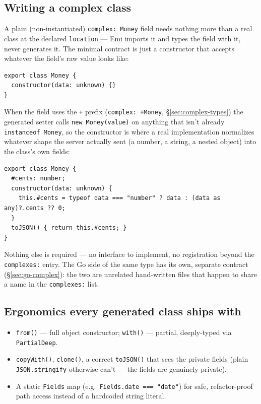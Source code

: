 \subsection{Writing a complex class}
\label{sec:js-complex}
A plain (non-instantiated) \texttt{complex: Money} field needs nothing
more than a real class at the declared \texttt{location} --- Emi imports
it and types the field with it, never generates it. The minimal contract
is just a constructor that accepts whatever the field's raw value looks
like:
\begin{lstlisting}
export class Money {
  constructor(data: unknown) {}
}
\end{lstlisting}
When the field uses the \texttt{+} prefix (\texttt{complex: +Money},
\S\ref{sec:complex-types}) the generated setter calls \texttt{new
Money(value)} on anything that isn't already \texttt{instanceof Money},
so the constructor is where a real implementation normalizes whatever
shape the server actually sent (a number, a string, a nested object)
into the class's own fields:
\begin{lstlisting}
export class Money {
  #cents: number;
  constructor(data: unknown) {
    this.#cents = typeof data === "number" ? data : (data as any)?.cents ?? 0;
  }
  toJSON() { return this.#cents; }
}
\end{lstlisting}
Nothing else is required --- no interface to implement, no registration
beyond the \texttt{complexes:} entry. The Go side of the same type has
its own, separate contract (\S\ref{sec:go-complex}): the two are
unrelated hand-written files that happen to share a name in the
\texttt{complexes:} list.

\subsection{Ergonomics every generated class ships with}
\begin{itemize}[leftmargin=1.1em,itemsep=2pt,topsep=2pt]
  \item \texttt{from()} --- full object constructor; \texttt{with()} ---
        partial, deeply-typed via \texttt{PartialDeep}.
  \item \texttt{copyWith()}, \texttt{clone()}, a correct \texttt{toJSON()}
        that sees the private fields (plain \texttt{JSON.stringify}
        otherwise can't --- the fields are genuinely private).
  \item A static \texttt{Fields} map (e.g.\ \texttt{Fields.date === "date"})
        for safe, refactor-proof path access instead of a hardcoded string
        literal.
\end{itemize}

